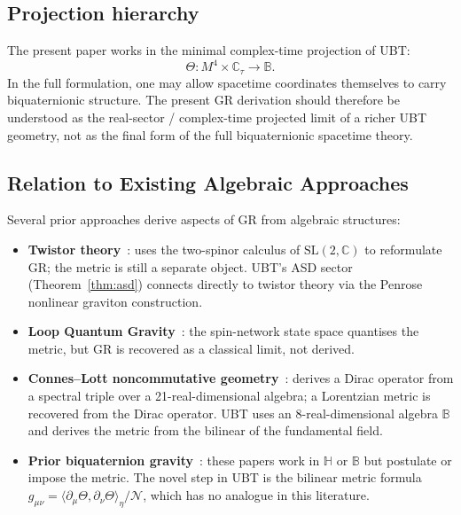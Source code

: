 \documentclass[12pt,a4paper]{article}
\theoremstyle{definition}
\theoremstyle{remark}
\newcommand{\BB}{\mathbb{B}}
\newcommand{\CC}{\mathbb{C}}
\newcommand{\HH}{\mathbb{H}}
\newcommand{\calN}{\mathcal{N}}
\begin{document}
\subsection{Projection hierarchy}

The present paper works in the minimal complex-time projection of UBT:
\[
\Theta : M^4 \times \mathbb C_\tau \to \mathbb B.
\]
In the full formulation, one may allow spacetime coordinates themselves to
carry biquaternionic structure. The present GR derivation should therefore be
understood as the real-sector / complex-time projected limit of a richer UBT
geometry, not as the final form of the full biquaternionic spacetime theory.

\subsection{Relation to Existing Algebraic Approaches}

Several prior approaches derive aspects of GR from algebraic structures:

\begin{itemize}
  \item \textbf{Twistor theory}~\cite{penrose1976,penrose_rindler1984}:
        uses the two-spinor calculus of $\mathrm{SL}(2,\CC)$ to reformulate
        GR; the metric is still a separate object.
        UBT's ASD sector (Theorem~\ref{thm:asd}) connects directly to twistor
        theory via the Penrose nonlinear graviton construction.

  \item \textbf{Loop Quantum Gravity}~\cite{thiemann2007}:
        the spin-network state space quantises the metric, but GR is
        recovered as a classical limit, not derived.

  \item \textbf{Connes--Lott noncommutative geometry}~\cite{connes1991}:
        derives a Dirac operator from a spectral triple over a
        21-real-dimensional algebra; a Lorentzian metric is recovered
        from the Dirac operator.
        UBT uses an 8-real-dimensional algebra $\BB$ and derives the
        metric from the bilinear of the fundamental field.

  \item \textbf{Prior biquaternion gravity}~\cite{adler1995,finkelstein1962,deleo1996}:
        these papers work in $\HH$ or $\BB$ but postulate or impose the
        metric.
        The novel step in UBT is the bilinear metric formula
        $g_{\mu\nu} = \langle\partial_\mu\Theta,\partial_\nu\Theta\rangle_\eta/\calN$,
        which has no analogue in this literature.
\end{itemize}
\end{document}
